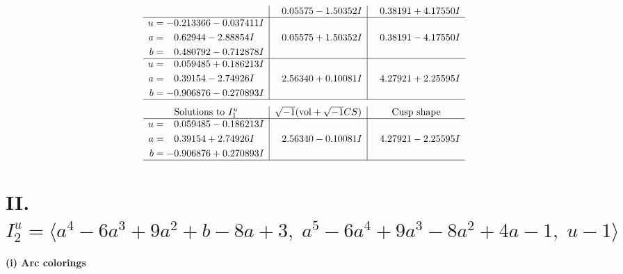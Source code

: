 \documentclass[1p]{elsarticle_modified}
\theoremstyle{definition}
\newcommand{\I}{\sqrt{-1}}
\begin{document}
$$\begin{array}{c|c|c}
 & \phantom{-}0.05575 - 1.50352 I & \phantom{-}0.38191 + 4.17550 I \\ \hline\begin{aligned}
u &= -0.213366 - 0.037411 I \\
a &= \phantom{-}0.62944 - 2.88854 I \\
b &= \phantom{-}0.480792 - 0.712878 I\end{aligned}
 & \phantom{-}0.05575 + 1.50352 I & \phantom{-}0.38191 - 4.17550 I \\ \hline\begin{aligned}
u &= \phantom{-}0.059485 + 0.186213 I \\
a &= \phantom{-}0.39154 - 2.74926 I \\
b &= -0.906876 - 0.270893 I\end{aligned}
 & \phantom{-}2.56340 + 0.10081 I & \phantom{-}4.27921 + 2.25595 I\\
 \hline 
 \end{array}$$\newpage$$\begin{array}{c|c|c}  
\text{Solutions to }I^u_{1}& \I (\text{vol} + \sqrt{-1}CS) & \text{Cusp shape}\\
 \hline 
\begin{aligned}
u &= \phantom{-}0.059485 - 0.186213 I \\
a &= \phantom{-}0.39154 + 2.74926 I \\
b &= -0.906876 + 0.270893 I\end{aligned}
 & \phantom{-}2.56340 - 0.10081 I & \phantom{-}4.27921 - 2.25595 I\\
 \hline 
 \end{array}$$\newpage\newpage\renewcommand{\arraystretch}{1}
\centering \section*{II. $I^u_{2}= \langle a^4-6 a^3+9 a^2+b-8 a+3,\;a^5-6 a^4+9 a^3-8 a^2+4 a-1,\;u-1 \rangle$}
\flushleft \textbf{(i) Arc colorings}\\
\end{document}
